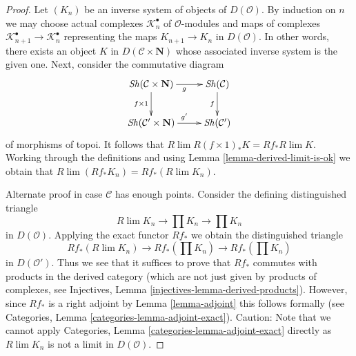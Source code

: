\documentclass[10pt,a4paper]{amsart}
\theoremstyle{plain}
\theoremstyle{definition}
\theoremstyle{remark}
\numberwithin{equation}{subsection}
\def\lim{\mathop{\mathrm{lim}}\nolimits}
\def\Sh{\mathop{\mathit{Sh}}\nolimits}
\begin{document}
\begin{proof}
Let $(K_n)$ be an inverse system of objects of $D(\mathcal{O})$.
By induction on $n$ we may choose actual complexes $\mathcal{K}_n^\bullet$
of $\mathcal{O}$-modules and maps of complexes
$\mathcal{K}_{n + 1}^\bullet \to \mathcal{K}_n^\bullet$ representing the
maps $K_{n + 1} \to K_n$ in $D(\mathcal{O})$. In other words, there exists
an object $K$ in $D(\mathcal{C} \times \mathbf{N})$ whose associated inverse
system is the given one. Next, consider the commutative diagram
$$
\xymatrix{
\Sh(\mathcal{C} \times \mathbf{N}) \ar[r]_g \ar[d]_{f \times 1} &
\Sh(\mathcal{C}) \ar[d]_f \\
\Sh(\mathcal{C}' \times \mathbf{N}) \ar[r]^{g'} &
\Sh(\mathcal{C}')
}
$$
of morphisms of topoi. It follows that
$R\lim R(f \times 1)_*K = Rf_* R\lim K$. Working through the definitions
and using Lemma \ref{lemma-derived-limit-is-ok}
we obtain that $R\lim (Rf_*K_n) = Rf_*(R\lim K_n)$.

\medskip\noindent
Alternate proof in case $\mathcal{C}$ has enough points. Consider the defining
distinguished triangle
$$
R\lim K_n \to \prod K_n \to \prod K_n
$$
in $D(\mathcal{O})$. Applying the exact functor $Rf_*$ we obtain
the distinguished triangle
$$
Rf_*(R\lim K_n) \to Rf_*\left(\prod K_n\right) \to Rf_*\left(\prod K_n\right)
$$
in $D(\mathcal{O}')$. Thus we see that it suffices to prove that
$Rf_*$ commutes with products in the derived category (which are not just
given by products of complexes, see
Injectives, Lemma \ref{injectives-lemma-derived-products}).
However, since $Rf_*$ is a right adjoint by Lemma \ref{lemma-adjoint}
this follows formally (see
Categories, Lemma \ref{categories-lemma-adjoint-exact}).
Caution: Note that we cannot apply
Categories, Lemma \ref{categories-lemma-adjoint-exact}
directly as $R\lim K_n$ is not a limit in $D(\mathcal{O})$.
\end{proof}
\end{document}
